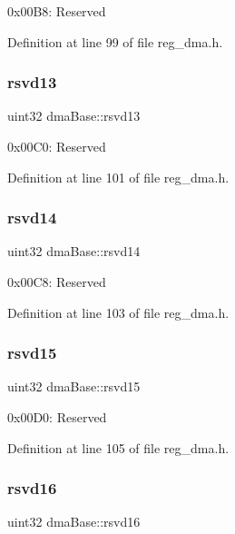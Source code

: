0x00\+B8\+: Reserved 

Definition at line 99 of file reg\+\_\+dma.\+h.

\mbox{\label{structdmaBase_a4ae037a706d344710855fe82abe4d5d8}} 
\subsubsection{\texorpdfstring{rsvd13}{rsvd13}}
{\footnotesize\ttfamily uint32 dma\+Base\+::rsvd13}

0x00\+C0\+: Reserved 

Definition at line 101 of file reg\+\_\+dma.\+h.

\mbox{\label{structdmaBase_a26c85a32d852d496746506b0168a913f}} 
\subsubsection{\texorpdfstring{rsvd14}{rsvd14}}
{\footnotesize\ttfamily uint32 dma\+Base\+::rsvd14}

0x00\+C8\+: Reserved 

Definition at line 103 of file reg\+\_\+dma.\+h.

\mbox{\label{structdmaBase_abdf230e93acb201a3d8c10550e833fba}} 
\subsubsection{\texorpdfstring{rsvd15}{rsvd15}}
{\footnotesize\ttfamily uint32 dma\+Base\+::rsvd15}

0x00\+D0\+: Reserved 

Definition at line 105 of file reg\+\_\+dma.\+h.

\mbox{\label{structdmaBase_a4482dc09b387c6d1cf03777adeb81277}} 
\subsubsection{\texorpdfstring{rsvd16}{rsvd16}}
{\footnotesize\ttfamily uint32 dma\+Base\+::rsvd16}

